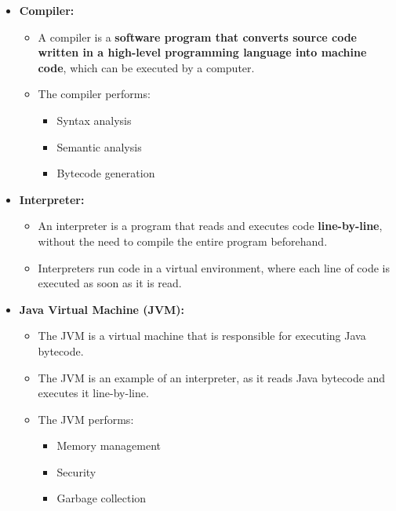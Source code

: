 \begin{flushleft}
	
	\begin{itemize}
		\item \textbf{Compiler: }
		\begin{itemize}
			\item A compiler is a \textbf{software program that converts source code written in a high-level programming language into machine code}, which can be executed by a computer. 
			\item The compiler performs:
			\begin{itemize}
				\item Syntax analysis
				\item Semantic analysis
				\item Bytecode generation
			\end{itemize}
		\end{itemize}
		
		
		\item \textbf{Interpreter:}
		\begin{itemize}
			\item An interpreter is a program that reads and executes code \textbf{line-by-line}, without the need to compile the entire program beforehand. 
			\item Interpreters run code in a virtual environment, where each line of code is executed as soon as it is read. 
		\end{itemize}
		
		
		\item \textbf{Java Virtual Machine (JVM):}
		\begin{itemize}
			\item The JVM is a virtual machine that is responsible for executing Java bytecode. 
			\item The JVM is an example of an interpreter, as it reads Java bytecode and executes it line-by-line. 
			\item The JVM performs:
			\begin{itemize}
				\item Memory management
				\item Security
				\item Garbage collection
			\end{itemize}  
		\end{itemize}
		
	\end{itemize}
	
\end{flushleft}

\newpage